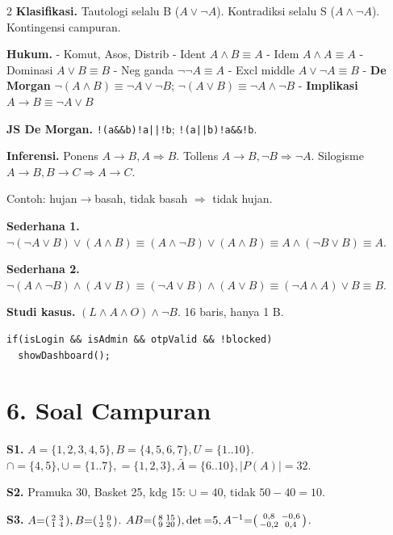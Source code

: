 \documentclass[8pt,a4paper]{extarticle}
\newcommand{\h}[1]{\textbf{#1}}
\begin{document}
\begin{multicols*}{2}
	\h{Klasifikasi.} Tautologi selalu B ($A\vee\neg A$). Kontradiksi selalu S ($A\wedge\neg A$). Kontingensi campuran.

	\h{Hukum.}
	- Komut, Asos, Distrib
	- Ident $A\wedge B{\equiv}A$
	- Idem $A\wedge A{\equiv}A$
	- Dominasi $A\vee B{\equiv}B$
	- Neg ganda $\neg\neg A{\equiv}A$
	- Excl middle $A\vee\neg A{\equiv}B$
	- \h{De Morgan} $\neg(A\wedge B){\equiv}\neg A\vee\neg B$; $\neg(A\vee B){\equiv}\neg A\wedge\neg B$
	- \h{Implikasi} $A\to B{\equiv}\neg A\vee B$

	\h{JS De Morgan.} \texttt{!(a\&\&b)}{\equiv}\texttt{!a||!b}; \texttt{!(a||b)}{\equiv}\texttt{!a\&\&!b}.

	\h{Inferensi.} Ponens $A\to B,A\Rightarrow B$. Tollens $A\to B,\neg B\Rightarrow\neg A$. Silogisme $A\to B,B\to C\Rightarrow A\to C$.

	Contoh: hujan$\to$basah, tidak basah $\Rightarrow$ tidak hujan.

	\h{Sederhana 1.} $\neg(\neg A\vee B)\vee(A\wedge B)\equiv(A\wedge\neg B)\vee(A\wedge B)\equiv A\wedge(\neg B\vee B)\equiv A$.

	\h{Sederhana 2.} $\neg(A\wedge\neg B)\wedge(A\vee B)\equiv(\neg A\vee B)\wedge(A\vee B)\equiv(\neg A\wedge A)\vee B\equiv B$.

	\h{Studi kasus.} $(L\wedge A\wedge O)\wedge\neg B$. 16 baris, hanya 1 B.
	\begin{lstlisting}
if(isLogin && isAdmin && otpValid && !blocked)
  showDashboard();
\end{lstlisting}

	\section*{6. Soal Campuran}

	\h{S1.} $A{=}\{1,2,3,4,5\},B{=}\{4,5,6,7\},U{=}\{1..10\}$. $\cap{=}\{4,5\},\cup{=}\{1..7\},{=}\{1,2,3\},\bar{A}{=}\{6..10\},|P(A)|{=}32$.

	\h{S2.} Pramuka 30, Basket 25, kdg 15: $\cup{=}40$, tidak $50{-}40{=}10$.

	\h{S3.} $A{=}\begin{psmallmatrix}2&3\\1&4\end{psmallmatrix},B{=}\begin{psmallmatrix}1&0\\2&5\end{psmallmatrix}$. $AB{=}\begin{psmallmatrix}8&15\\9&20\end{psmallmatrix},\det{=}5,A^{-1}{=}\begin{psmallmatrix}0{,}8&{-}0{,}6\\{-}0{,}2&0{,}4\end{psmallmatrix}$.


\end{multicols*}
\end{document}

